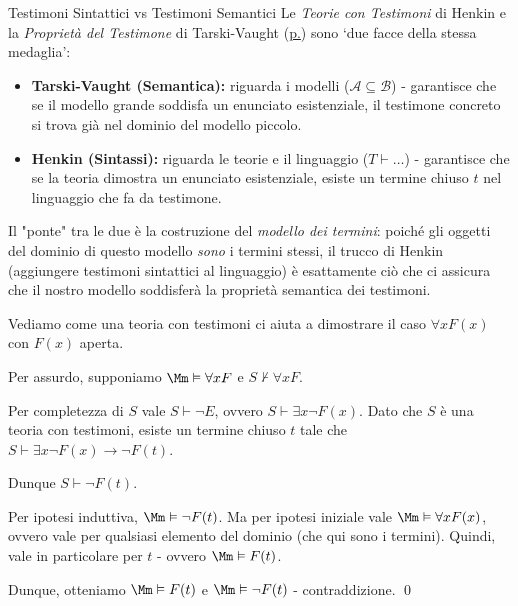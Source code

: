 \documentclass[a4paper,11pt]{report}
\begin{document}
\begin{gframe}{Testimoni Sintattici vs Testimoni Semantici}
    Le \textit{Teorie con Testimoni} di Henkin e la \textit{Proprietà del Testimone} di Tarski-Vaught (\underline{p.\pageref{criterio-tarski}}) sono `due facce della stessa medaglia':
    \begin{itemize}
        \item \textbf{Tarski-Vaught (Semantica):} riguarda i modelli (\( \mathcal{A} \subseteq \mathcal{B} \)) - garantisce che se il modello grande soddisfa un enunciato esistenziale, il testimone concreto si trova già nel dominio del modello piccolo.
        \item \textbf{Henkin (Sintassi):} riguarda le teorie e il linguaggio (\( T \vdash \dots \)) - garantisce che se la teoria dimostra un enunciato esistenziale, esiste un termine chiuso \( t \) nel linguaggio che fa da testimone.
    \end{itemize}
    Il "ponte" tra le due è la costruzione del \textit{modello dei termini}: poiché gli oggetti del dominio di questo modello \textit{sono} i termini stessi, il trucco di Henkin (aggiungere testimoni sintattici al linguaggio) è esattamente ciò che ci assicura che il nostro modello soddisferà la proprietà semantica dei testimoni.
\end{gframe}

Vediamo come una teoria con testimoni ci aiuta a dimostrare il caso \( \forall x F(x) \) con \( F(x) \) aperta.

\begin{proofframe}[title=Dimostriamo che se \( \Mm \vDash \forall x F \) allora \(S \vdash \forall x F\)]

Per assurdo, supponiamo \( \Mm \vDash \forall x F \) e \( S \not\vdash \forall x F \).

Per completezza di \( S \) vale \( S \vdash \neg E \), ovvero \( S \vdash \exists x \neg F(x) \). Dato che \( S \) è una teoria con testimoni, esiste un termine chiuso \( t \) tale che \( S \vdash \exists x \neg F(x) \to \neg F (t) \). 

Dunque \( S\vdash \neg F(t) \).

Per ipotesi induttiva, \( \Mm \vDash \neg F(t)\). Ma per ipotesi iniziale vale \( \Mm \vDash \forall x F(x) \), ovvero vale per qualsiasi elemento del dominio (che qui sono i termini). Quindi, vale in particolare per \( t \) - ovvero \( \Mm \vDash F(t) \).

Dunque, otteniamo \( \Mm \vDash F(t)\) e \( \Mm \vDash \neg F(t) \) - contraddizione. \qed

\end{proofframe}
\end{document}
